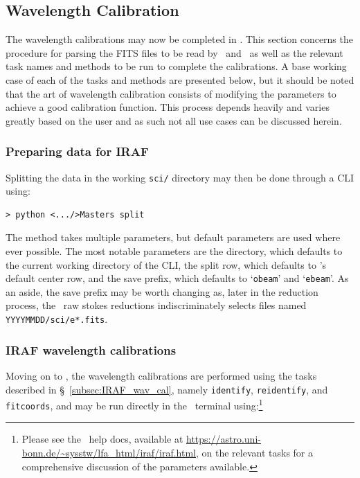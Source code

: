 \subsection{Wavelength Calibration} \label{subsec:reduc_wav}

The wavelength calibrations may now be completed in \iraf. This section concerns the procedure for parsing the \gls{FITS} files to be read by \iraf\ and \polsalt\ as well as the relevant task names and methods to be run to complete the calibrations. A base working case of each of the tasks and methods are presented below, but it should be noted that the art of wavelength calibration consists of modifying the parameters to achieve a good calibration function. This process depends heavily and varies greatly based on the user and as such not all use cases can be discussed herein.

\subsubsection{Preparing data for IRAF}

Splitting the data in the working \texttt{sci/} directory may then be done through a \gls{CLI} using:

\begin{verbatim}> python <.../>Masters split\end{verbatim}

The method takes multiple parameters, but default parameters are used where ever possible. The most notable parameters are the directory, which defaults to the current working directory of the \gls{CLI}, the split row, which defaults to \polsalt's default center row, and the save prefix, which defaults to `\texttt{obeam}' and `\texttt{ebeam}'. As an aside, the save prefix may be worth changing as, later in the reduction process, the \polsalt\ raw stokes reductions indiscriminately selects files named \texttt{YYYYMMDD/sci/e*.fits}.


\subsubsection{IRAF wavelength calibrations}

Moving on to \iraf, the wavelength calibrations are performed using the tasks described in \S~\ref{subsec:IRAF_wav_cal}, namely \texttt{identify}, \texttt{reidentify}, and \texttt{fitcoords}, and may be run directly in the \iraf\ terminal using:\footnote{Please see the \iraf\ help docs, available at \url{https://astro.uni-bonn.de/~sysstw/lfa_html/iraf/iraf.html}, on the relevant tasks for a comprehensive discussion of the parameters available.}


